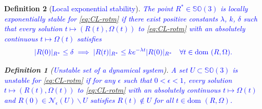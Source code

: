\documentclass{article}
\newcommand{\dom}{\text{dom }}
\newcommand{\SOthree}{\mathbb{SO}(3)}
\newtheorem{definition}{Definition}
\newcommand{\textblue}[1]{\textcolor{blue}{#1}}
\newcommand{\Rtilde}{\tilde{R}}
\newcommand{\normSOthree}[1]{{{\vert}#1 {\vert}_I}}
\newcommand{\expo}[1]{e^{#1}}
\newcommand{\Rstar}{{R^*}}
\newcommand{\neighbourhood}[2]{\mathcal{N}_{#1}(#2)}
\begin{document}

\begin{definition}[\textblue{Local exponential stability}]\label{def:local_lyap_stab}
\textblue{The point $\Rstar\in\SOthree$ is locally exponentially stable {for \eqref{eq:CL-rotm}} if there exist positive constants $\lambda$, $k$, $\delta$ such that every solution $t\mapsto (R(t), \Omega(t))$ {to \eqref{eq:CL-rotm}} with an absolutely continuous $t\mapsto \Omega(t)$ satisfies}
\begin{align*}
    \textblue{|R(0)|_{\Rstar}\leq \delta \implies |R(t)|_{\Rstar} \leq  k\expo{-\lambda t} |R(0)|_{\Rstar} \quad \forall t \in \dom{(R,\Omega)}.}
\end{align*}

\begin{definition}[\textblue{Unstable set of a dynamical system}] \textblue{A set $U\subset \SOthree$ is unstable for \eqref{eq:CL-rotm} if for any $\epsilon$ such that $0 < \epsilon < 1$, every solution $t\mapsto (R(t),\Omega(t))$ to \eqref{eq:CL-rotm} with an absolutely continuous $t\mapsto \Omega(t)$ and $R(0) \in \neighbourhood{\epsilon}{U}\backslash U$ satisfies $R(t)\notin U$ for all $t\in \dom{(R,\Omega)}$.  }
    
\end{definition}




\end{definition}
\end{document}
